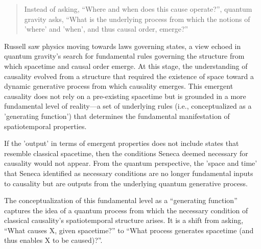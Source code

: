 \begin{quote}
    Instead of asking, ``Where and when does this cause operate?'', quantum gravity asks, ``What is the underlying process from which the notions of 'where' and 'when', and thus causal order, emerge?''
\end{quote}

Russell saw physics moving towards laws governing states, a view echoed in quantum gravity's search for fundamental rules governing the structure from which spacetime and causal order emerge. At this stage, the understanding of causality evolved from a structure that required the existence of space toward a dynamic generative process from which causality emerges. This emergent causality does not rely on a pre-existing spacetime but is grounded in a more fundamental level of reality—a set of underlying rules (i.e., conceptualized as a 'generating function') that determines the fundamental manifestation of spatiotemporal properties.

If the 'output' in terms of emergent properties does not include states that resemble classical spacetime, then the conditions Seneca deemed necessary for causality would not appear. From the quantum perspective, the 'space and time' that Seneca identified as necessary conditions are no longer fundamental inputs to causality but are outputs from the underlying quantum generative process.

The conceptualization of this fundamental level as a ``generating function'' captures the idea of a quantum process from which the necessary condition of classical causality's spatiotemporal structure arises. It is a shift from asking, ``What causes X, given spacetime?'' to ``What process generates spacetime (and thus enables X to be caused)?''.

\newpage
